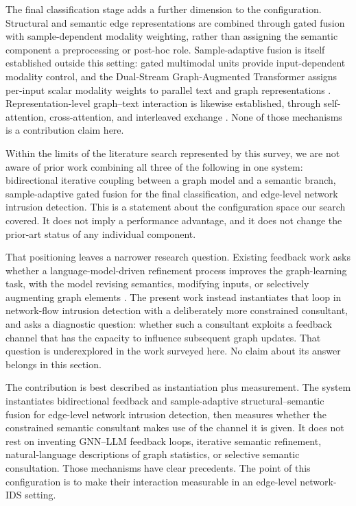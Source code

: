 The final classification stage adds a further dimension to the configuration. Structural and
semantic edge representations are combined through gated fusion with
sample-dependent modality weighting, rather than assigning the semantic component a
preprocessing or post-hoc role. Sample-adaptive fusion is itself established outside this
setting: gated multimodal units provide input-dependent modality control, and the
Dual-Stream Graph-Augmented Transformer assigns per-input scalar modality weights to
parallel text and graph representations \citep{arevalo2017gmu,moorthy2025dualstream}.
Representation-level graph--text interaction is likewise established, through
self-attention, cross-attention, and interleaved exchange
\citep{li2024ragformer,beiranvand2026bigtex,lee2025cast}. None of those mechanisms is a
contribution claim here.

Within the limits of the literature search represented by this survey, we are not aware of
prior work combining all three of the following in one system: bidirectional iterative
coupling between a graph model and a semantic branch, sample-adaptive gated fusion for the
final classification, and edge-level network intrusion detection. This is a statement about
the configuration space our search covered. It does not imply a performance advantage, and
it does not change the prior-art status of any individual component.

That positioning leaves a narrower research question. Existing feedback work asks whether a
language-model-driven refinement process improves the graph-learning task, with the model
revising semantics, modifying inputs, or selectively augmenting graph elements
\citep{qiao2025login,thapaliya2025das,loveland2025glance,wang2025rograd}. The present work
instead instantiates that loop in network-flow intrusion detection with a deliberately more
constrained consultant, and asks a diagnostic question: whether such a consultant exploits a
feedback channel that has the capacity to influence subsequent graph updates. That question
is underexplored in the work surveyed here. No claim about its answer belongs in this
section.

The contribution is best described as instantiation plus measurement. The system instantiates
bidirectional feedback and sample-adaptive structural--semantic fusion for edge-level network
intrusion detection, then measures whether the constrained semantic consultant makes use of
the channel it is given. It does not rest on inventing GNN--LLM feedback loops, iterative
semantic refinement, natural-language descriptions of graph statistics, or selective semantic
consultation. Those mechanisms have clear precedents. The point of this configuration is to
make their interaction measurable in an edge-level network-IDS setting.
